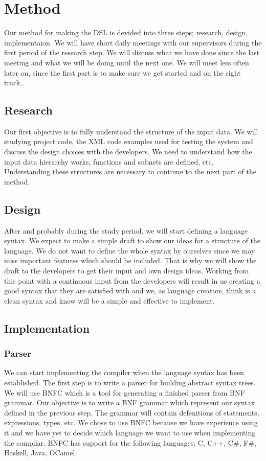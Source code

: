 \documentclass[a4paper]{article}
\begin{document}
\section{Method}
Our method for making the DSL is devided into three steps; research,
design, implementaion. We will have short daily meetings with our
supervisors during the first period of the research step. We will
discuss what we have done since the last meeting and what we will be
doing until the next one. We will meet less often later on, since the
first part is to make sure we get started and on the right track..

\subsection{Research}
Our first objective is to fully understand the structure of the input
data. We will studying project code, the XML code examples used for
testing the system and discuss the design choices with the
developers. We need to understand how the input data hierarchy works,
functions and subnets are defined, etc. Understanding these structures
are necessary to continue to the next part of the method.

\subsection{Design}
After and probably during the study period, we will start defining a
language syntax. We expect to make a simple draft to show our ideas
for a structure of the language. We do not want to define the whole
syntax by ourselves since we may miss important features which should
be included. That is why we will show the draft to the developers to
get their input and own design ideas. Working from this point with a
continuous input from the developers will result in us creating a good
syntax that they are satisfied with and we, as language creators,
think is a clean syntax and know will be a simple and effective to
implement.

\subsection{Implementation}
\subsubsection{Parser}
We can start implementing the compiler when the language syntax has
been established. The first step is to write a parser for building
abstract syntax trees. We will use BNFC which is a tool for generating
a finished parser from BNF grammar. Our objective is to write a BNF
grammar which represent our syntax defined in the previous step. The
grammar will contain defenitions of statements, expressions, types,
etc. We chose to use BNFC because we have experience using it and we
have yet to decide which language we want to use when implementing the
compilar. BNFC has support for the following languages: C, C++, C#,
F#, Haskell, Java, OCamel.
\end{document}
